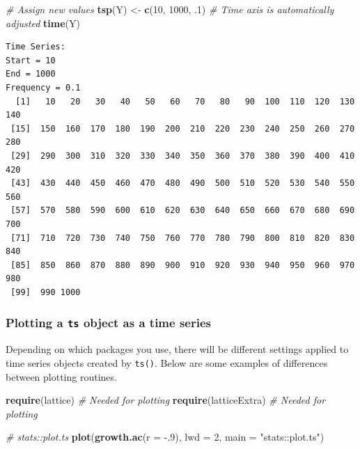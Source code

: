 \documentclass[]{book}
\newenvironment{Shaded}{\begin{snugshade}}{\end{snugshade}}
\newcommand{\KeywordTok}[1]{\textcolor[rgb]{0.13,0.29,0.53}{\textbf{{#1}}}}
\newcommand{\DataTypeTok}[1]{\textcolor[rgb]{0.13,0.29,0.53}{{#1}}}
\newcommand{\DecValTok}[1]{\textcolor[rgb]{0.00,0.00,0.81}{{#1}}}
\newcommand{\StringTok}[1]{\textcolor[rgb]{0.31,0.60,0.02}{{#1}}}
\newcommand{\CommentTok}[1]{\textcolor[rgb]{0.56,0.35,0.01}{\textit{{#1}}}}
\newcommand{\NormalTok}[1]{{#1}}
\begin{document}
\begin{Shaded}
\begin{Highlighting}[]
\CommentTok{# Assign new values}
\KeywordTok{tsp}\NormalTok{(Y) <-}\StringTok{ }\KeywordTok{c}\NormalTok{(}\DecValTok{10}\NormalTok{, }\DecValTok{1000}\NormalTok{, .}\DecValTok{1}\NormalTok{)}
\CommentTok{# Time axis is automatically adjusted }
\KeywordTok{time}\NormalTok{(Y)}
\end{Highlighting}
\end{Shaded}

\begin{verbatim}
Time Series:
Start = 10 
End = 1000 
Frequency = 0.1 
  [1]   10   20   30   40   50   60   70   80   90  100  110  120  130  140
 [15]  150  160  170  180  190  200  210  220  230  240  250  260  270  280
 [29]  290  300  310  320  330  340  350  360  370  380  390  400  410  420
 [43]  430  440  450  460  470  480  490  500  510  520  530  540  550  560
 [57]  570  580  590  600  610  620  630  640  650  660  670  680  690  700
 [71]  710  720  730  740  750  760  770  780  790  800  810  820  830  840
 [85]  850  860  870  880  890  900  910  920  930  940  950  960  970  980
 [99]  990 1000
\end{verbatim}

\subsubsection*{\texorpdfstring{Plotting a \texttt{ts} object as a time
series}{Plotting a ts object as a time series}}\label{plotting-a-ts-object-as-a-time-series}

Depending on which packages you use, there will be different settings
applied to time series objects created by \texttt{ts()}. Below are some
examples of differences between plotting routines.

\begin{Shaded}
\begin{Highlighting}[]
\KeywordTok{require}\NormalTok{(lattice)       }\CommentTok{# Needed for plotting}
\KeywordTok{require}\NormalTok{(latticeExtra)  }\CommentTok{# Needed for plotting}

\CommentTok{# stats::plot.ts}
\KeywordTok{plot}\NormalTok{(}\KeywordTok{growth.ac}\NormalTok{(}\DataTypeTok{r =} \NormalTok{-.}\DecValTok{9}\NormalTok{), }\DataTypeTok{lwd =} \DecValTok{2}\NormalTok{, }\DataTypeTok{main =} \StringTok{"stats::plot.ts"}\NormalTok{)}
\end{Highlighting}
\end{Shaded}
\end{document}
